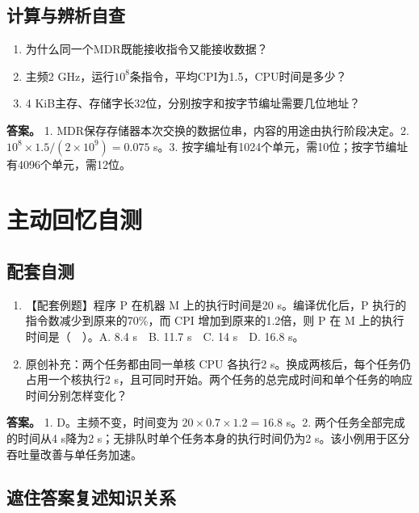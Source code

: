 \subsection{计算与辨析自查}\label{CO01-extra-check}

\begin{enumerate}
\def\labelenumi{\arabic{enumi}.}
\tightlist
\item
  为什么同一个MDR既能接收指令又能接收数据？
\item
  主频2 GHz，运行\(10^8\)条指令，平均CPI为1.5，CPU时间是多少？
\item
  4 KiB主存、存储字长32位，分别按字和按字节编址需要几位地址？
\end{enumerate}

\textbf{答案。} 1. MDR保存存储器本次交换的数据位串，内容的用途由执行阶段决定。2. \(10^8\times1.5/(2\times10^9)=0.075\) s。3. 按字编址有1024个单元，需10位；按字节编址有4096个单元，需12位。

\section{主动回忆自测}\label{CO01-recall}

\subsection{配套自测}\label{CO01-11}

\begin{enumerate}
\def\labelenumi{\arabic{enumi}.}
\tightlist
\item
  【配套例题】程序 P 在机器 M 上的执行时间是20 s。编译优化后，P 执行的指令数减少到原来的70\%，而 CPI 增加到原来的1.2倍，则 P 在 M 上的执行时间是（　）。A. 8.4 s　B. 11.7 s　C. 14 s　D. 16.8 s。
\item
  原创补充：两个任务都由同一单核 CPU 各执行2 s。换成两核后，每个任务仍占用一个核执行2 s，且可同时开始。两个任务的总完成时间和单个任务的响应时间分别怎样变化？
\end{enumerate}

\textbf{答案。} 1. D。主频不变，时间变为 \(20\times0.7\times1.2=16.8\) s。2. 两个任务全部完成的时间从4 s降为2 s；无排队时单个任务本身的执行时间仍为2 s。该小例用于区分吞吐量改善与单任务加速。

\subsection{遮住答案复述知识关系}\label{CO01-recall-new}

